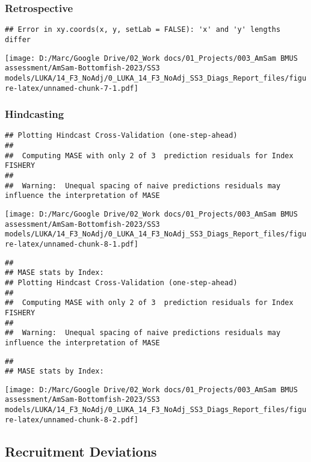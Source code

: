 \documentclass[
]{article}
\begin{document}
\hypertarget{retrospective}{%
\subsubsection{Retrospective}\label{retrospective}}

\begin{verbatim}
## Error in xy.coords(x, y, setLab = FALSE): 'x' and 'y' lengths differ
\end{verbatim}

\texttt{[image: D:/Marc/Google Drive/02\_Work docs/01\_Projects/003\_AmSam BMUS assessment/AmSam-Bottomfish-2023/SS3 models/LUKA/14\_F3\_NoAdj/0\_LUKA\_14\_F3\_NoAdj\_SS3\_Diags\_Report\_files/figure-latex/unnamed-chunk-7-1.pdf]}

\hypertarget{hindcasting}{%
\subsubsection{Hindcasting}\label{hindcasting}}

\begin{verbatim}
## Plotting Hindcast Cross-Validation (one-step-ahead) 
## 
##  Computing MASE with only 2 of 3  prediction residuals for Index FISHERY 
## 
##  Warning:  Unequal spacing of naive predictions residuals may influence the interpretation of MASE
\end{verbatim}

\texttt{[image: D:/Marc/Google Drive/02\_Work docs/01\_Projects/003\_AmSam BMUS assessment/AmSam-Bottomfish-2023/SS3 models/LUKA/14\_F3\_NoAdj/0\_LUKA\_14\_F3\_NoAdj\_SS3\_Diags\_Report\_files/figure-latex/unnamed-chunk-8-1.pdf]}

\begin{verbatim}
## 
## MASE stats by Index:
## Plotting Hindcast Cross-Validation (one-step-ahead) 
## 
##  Computing MASE with only 2 of 3  prediction residuals for Index FISHERY 
## 
##  Warning:  Unequal spacing of naive predictions residuals may influence the interpretation of MASE
\end{verbatim}

\begin{verbatim}
## 
## MASE stats by Index:
\end{verbatim}

\texttt{[image: D:/Marc/Google Drive/02\_Work docs/01\_Projects/003\_AmSam BMUS assessment/AmSam-Bottomfish-2023/SS3 models/LUKA/14\_F3\_NoAdj/0\_LUKA\_14\_F3\_NoAdj\_SS3\_Diags\_Report\_files/figure-latex/unnamed-chunk-8-2.pdf]}

\hypertarget{recruitment-deviations}{%
\subsection{Recruitment Deviations}\label{recruitment-deviations}}
\end{document}
